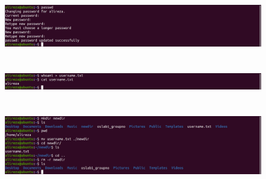 \documentclass{article}
\begin{document}
\section{}
\begin{figure}[ht]
    \centering
    \includegraphics[width=1.0\textwidth]{figures/6.png}
    \caption{}
    \label{fig:fig1}
\end{figure}
\FloatBarrier

\section{}
\begin{figure}[ht]
    \centering
    \includegraphics[width=1.0\textwidth]{figures/7.png}
    \caption{}
    \label{fig:fig1}
\end{figure}
\FloatBarrier

\section{}
\begin{figure}[ht]
    \centering
    \includegraphics[width=1.0\textwidth]{figures/8.png}
    \caption{}
    \label{fig:fig1}
\end{figure}
\FloatBarrier
\end{document}
